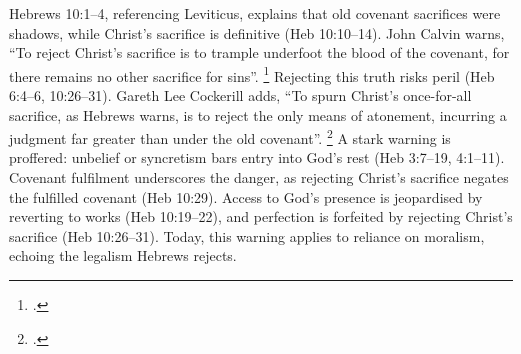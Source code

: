 \documentclass[12pt]{article}
\def\christ{the Messiah}
\def\christ{Christ}
\begin{document}
Hebrews 10:1--4, referencing Leviticus, explains that old covenant sacrifices
were shadows, while \christ{}’s sacrifice is definitive (Heb 10:10--14). John
Calvin warns, ``To reject Christ’s sacrifice is to trample underfoot the blood
of the covenant, for there remains no other sacrifice for sins''.
\footcite[245]{Calvin1853}
Rejecting this truth risks peril (Heb 6:4--6, 10:26--31).
%
Gareth Lee Cockerill adds, ``To spurn Christ’s once-for-all sacrifice, as
Hebrews warns, is to reject the only means of atonement, incurring a judgment
far greater than under the old covenant''. \footcite[482]{Cockerill2012}
%
A stark warning is proffered:
unbelief or syncretism bars entry into God’s rest (Heb 3:7--19, 4:1--11).
%
Covenant fulfilment underscores the danger, as rejecting \christ{}’s sacrifice
negates the fulfilled covenant (Heb 10:29).
%
Access to God’s presence is jeopardised by reverting to works (Heb 10:19--22),
and perfection is forfeited by rejecting \christ{}’s sacrifice (Heb 10:26--31).
%
Today, this warning applies to reliance on moralism, echoing the legalism
Hebrews rejects.
\end{document}
